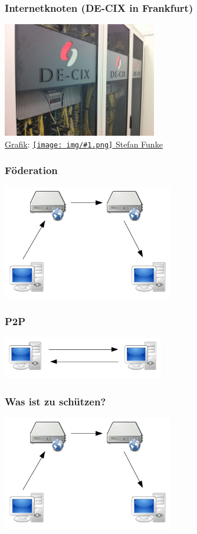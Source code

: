 \documentclass[12pt]{beamer}
\newcommand{\cc}[1]{\texttt{[image: img/\#1.png]}\hspace{1mm}}
\begin{document}
\begin{frame}
    \frametitle{Internetknoten (DE-CIX in Frankfurt)}
    \begin{center}
      \includegraphics[height=5cm]{img/de_cix.jpg}
      \\{\small \href{https://de.wikipedia.org/wiki/DE-CIX\#/media/File:DE-CIX\_GERMANY\_-\_Switch\_Rack\_\%286218137120\%29.jpg}{Grafik}: \href{https://creativecommons.org/licenses/by-sa/2.0/}{\cc{by-sa} Stefan Funke}}
    \end{center}
\end{frame}

\begin{frame}
    \frametitle{Föderation}
    \begin{center}
      \includegraphics[height=5cm]{img/fed.png}
    \end{center}
\end{frame}

\begin{frame}
    \frametitle{P2P}
    \begin{center}
      \includegraphics[width=7cm]{img/direkt.png}
    \end{center}
\end{frame}

\begin{frame}
    \frametitle{Was ist zu schützen?}
    \begin{center}
      \includegraphics[height=5cm]{img/fed.png}
    \end{center}
\end{frame}
\end{document}
